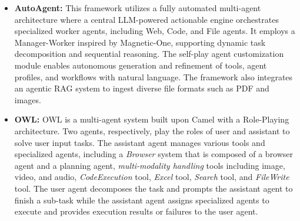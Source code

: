 \begin{itemize}
    \item \textbf{AutoAgent:} This framework utilizes a fully automated multi-agent architecture where a central LLM-powered actionable engine orchestrates specialized worker agents, including Web, Code, and File agents. It employs a Manager-Worker inspired by Magnetic-One, supporting dynamic task decomposition and sequential reasoning. The self-play agent customization module enables autonomous generation and refinement of tools, agent profiles, and workflows with natural language. The framework also integrates an agentic RAG system to ingest diverse file formats such as PDF and images.
    \item \textbf{OWL:} OWL is a multi-agent system built upon Camel with a Role-Playing architecture. Two agents, respectively, play the roles of user and assistant to solve user input tasks. The assistant agent manages various tools and specialized agents, including a \textit{Browser} system that is composed of a browser agent and a planning agent, \textit{multi-modality handling} tools including image, video, and audio, \textit{CodeExecution} tool, \textit{Excel} tool, \textit{Search} tool, and \textit{FileWrite} tool. The user agent decomposes the task and prompts the assistant agent to finish a sub-task while the assistant agent assigns specialized agents to execute and provides execution results or failures to the user agent.
\end{itemize}